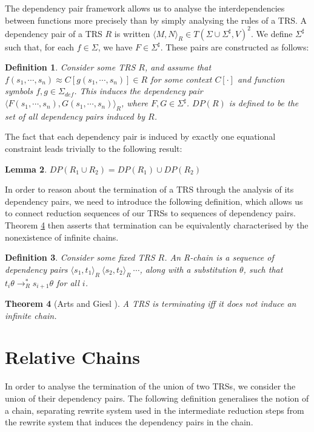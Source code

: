 \documentclass{article}
\newtheorem{theorem}{Theorem}[section]
\newtheorem{lemma}[theorem]{Lemma}
\newtheorem{definition}[theorem]{Definition}
\newcommand{\dpair}[2]{\langle #1, #2 \rangle}
\begin{document}
The dependency pair framework \cite{arts2000dependency} allows us to analyse the interdependencies between functions more precisely than by simply analysing the rules of a TRS. A dependency pair of a TRS $R$ is written $\dpair{M}{N}_R \in T(\Sigma \cup \Sigma^\sharp, V)^2$. We define $\Sigma^\sharp$ such that, for each $f \in \Sigma$, we have $F \in \Sigma^\sharp$. These pairs are constructed as follows:
\begin{definition}
    Consider some TRS $R$, and assume that $f(s_1, \cdots, s_n) \approx C[g(s_1, \cdots, s_n)] \in R$ for some context $C[\cdot]$ and function symbols $f, g \in \Sigma_{def}$. This induces the \emph{dependency pair} $\dpair{F (s_1, \cdots, s_n)}{G(s_1, \cdots, s_n)}_R $, where $F, G \in \Sigma^\sharp$. $DP(R)$ is defined to be the set of all dependency pairs induced by $R$.
\end{definition}
The fact that each dependency pair is induced by exactly one equational constraint leads trivially to the following result:
\begin{lemma} \label{thm:dep_pair_mod}
    $DP(R_1 \cup R_2) = DP(R_1) \cup DP(R_2)$
\end{lemma}
In order to reason about the termination of a TRS through the analysis of its dependency pairs, we need to introduce the following definition, which allows us to connect reduction sequences of our TRSs to sequences of dependency pairs. Theorem \ref{thm:no_infinite_chains} then asserts that termination can be equivalently characterised by the nonexistence of infinite chains.
\begin{definition}
    Consider some fixed TRS $R$. An \emph{R-chain} is a sequence of dependency pairs $\dpair{s_1}{t_1}_R ~ \dpair{s_2}{t_2}_R ~ \cdots$, along with a substitution $\theta$, such that $t_i \theta \rightarrow_R^* s_{i+1}\theta$ for all $i$.
\end{definition}
\begin{theorem}[Arts and Giesl \cite{arts2000dependency}]\label{thm:no_infinite_chains}
    A TRS is terminating iff it does not induce an infinite chain.
\end{theorem} 



\section{Relative Chains}

In order to analyse the termination of the union of two TRSs, we consider the union of their dependency pairs. The following definition generalises the notion of a chain, separating rewrite system used in the intermediate reduction steps from the rewrite system that induces the dependency pairs in the chain.
\end{document}
